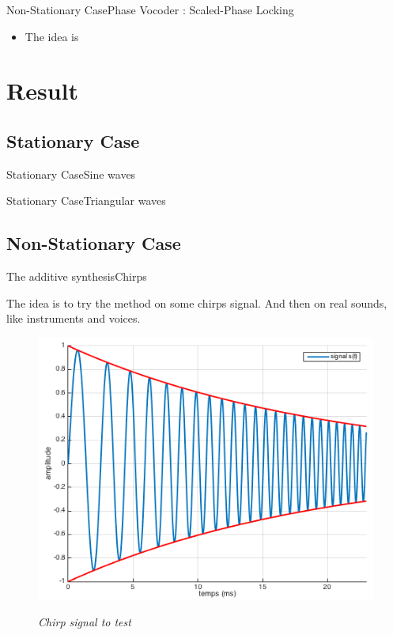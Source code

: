 \documentclass{bredelebeamer}
\begin{document}
\begin{frame}{Non-Stationary Case}{Phase Vocoder : Scaled-Phase Locking}
\begin{itemize}
\item The idea is
\end{itemize}

\end{frame}


\section{Result}
\subsection{Stationary Case}
\begin{frame}{Stationary Case}{Sine waves}

\end{frame}
\begin{frame}{Stationary Case}{Triangular waves}

\end{frame}
\subsection{Non-Stationary Case}
\begin{frame}{The additive synthesis}{Chirps}

The idea is to try the method on some chirps signal. And then on real sounds, like instruments and voices.

\begin{figure}
{\includegraphics[scale=0.45]{chirps.png}}
	\caption{\it Chirp signal to test}
\end{figure}

\end{frame}
\end{document}
